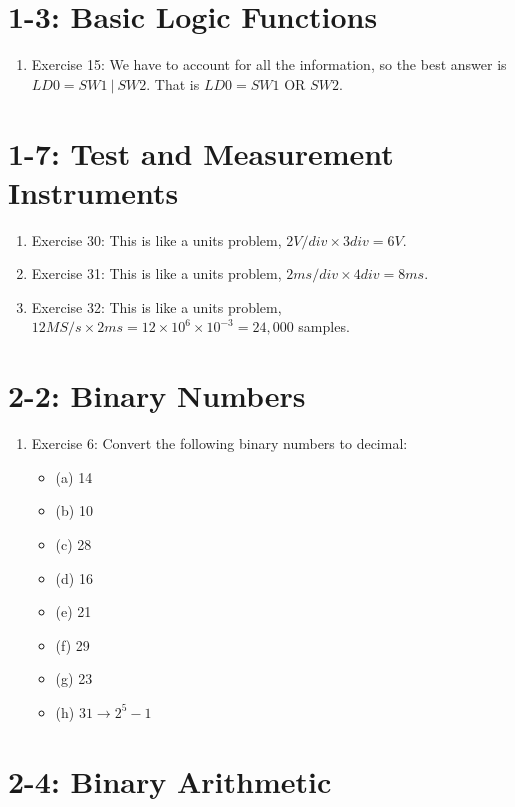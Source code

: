 \documentclass[10pt]{article}
\begin{document}
\section{1-3: Basic Logic Functions}

\begin{enumerate}
\item Exercise 15: We have to account for all the information, so the best answer is $LD0 = SW1 ~ | ~ SW2$.  That is $LD0 = SW1$ OR $SW2$.
\end{enumerate}

\section{1-7: Test and Measurement Instruments}

\begin{enumerate}
\item Exercise 30: This is like a units problem, $2 V/div \times 3 div = 6 V$.
\item Exercise 31: This is like a units problem, $2 ms/div \times 4 div = 8 ms$.
\item Exercise 32: This is like a units problem, $12 MS/s \times 2 ms = 12 \times 10^{6} \times 10^{-3} = 24,000$ samples.
\end{enumerate}

\section{2-2: Binary Numbers}

\begin{enumerate}
\item Exercise 6: Convert the following binary numbers to decimal:
\begin{itemize}
\item (a) 14
\item (b) 10
\item (c) 28
\item (d) 16
\item (e) 21
\item (f) 29
\item (g) 23
\item (h) $31 \rightarrow 2^5 - 1$
\end{itemize}
\end{enumerate}

\section{2-4: Binary Arithmetic}
\end{document}
